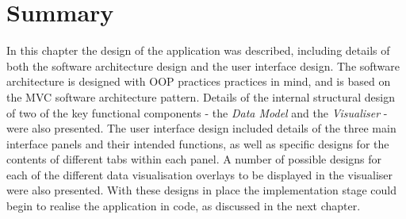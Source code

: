 
\section{Summary}

In this chapter the design of the application was described, including details of both the software architecture design and the user interface design. The software architecture is designed with OOP practices practices in mind, and is based on the MVC software architecture pattern. Details of the internal structural design of two of the key functional components - the \textit{Data Model} and the \textit{Visualiser} - were also presented. The user interface design included details of the three main interface panels and their intended functions, as well as specific designs for the contents of different tabs within each panel. A number of possible designs for each of the different data visualisation overlays to be displayed in the visualiser were also presented. With these designs in place the implementation stage could begin to realise the application in code, as discussed in the next chapter.